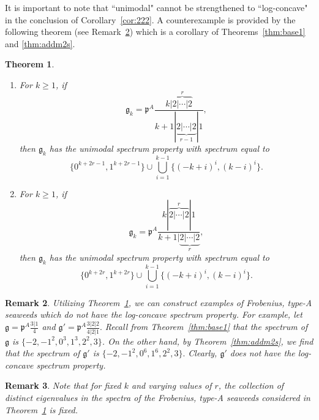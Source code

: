\documentclass[letterpaper,10pt]{article}
\newtheorem{theorem}{Theorem}
\newtheorem{remark}[theorem]{Remark}
\begin{document}
It is important to note that ``unimodal" cannot be strengthened to ``log-concave" in the conclusion of Corollary~\ref{cor:222}. A counterexample is provided by the following theorem (see Remark~\ref{rem:nlcc}) which is a corollary of Theorems~\ref{thm:base1} and \ref{thm:addm2s}.


\begin{theorem}\label{thm:base1ext}
\begin{enumerate}
    \item[\textup{(1)}] For $k\ge 1$, if $$\mathfrak{g}_k=\mathfrak{p}^A\frac{k|\overbrace{2|\cdots|2}^r}{k+1|\underbrace{2|\cdots|2}_{r-1}|1},$$ then $\mathfrak{g}_k$ has the unimodal spectrum property with spectrum equal to 
$$\{0^{k+2r-1},1^{k+2r-1}\}\cup\bigcup_{i=1}^{k-1}\{(-k+i)^i,(k-i)^i\}.$$
\item[\textup{(2)}] For $k\ge 1$, if $$\mathfrak{g}_k=\mathfrak{p}^A\frac{k|\overbrace{2|\cdots|2}^r|1}{k+1|\underbrace{2|\cdots|2}_{r}},$$ then $\mathfrak{g}_k$ has the unimodal spectrum property with spectrum equal to $$\{0^{k+2r},1^{k+2r}\}\cup\bigcup_{i=1}^{k-1}\{(-k+i)^i,(k-i)^i\}.$$
\end{enumerate}
\end{theorem}

\begin{remark}\label{rem:nlcc}
    Utilizing Theorem~\ref{thm:base1ext}, we can construct examples of Frobenius, type-A seaweeds which do not have the log-concave spectrum property. For example, let $\mathfrak{g}=\mathfrak{p}^A\frac{3|1}{4}$ and $\mathfrak{g}'=\mathfrak{p}^A\frac{3|2|2}{4|2|1}.$ Recall from Theorem~\ref{thm:base1} that the spectrum of $\mathfrak{g}$ is $\{-2,-1^2,0^3,1^3,2^2,3\}$. On the other hand, by Theorem~\ref{thm:addm2s}, we find that the spectrum of $\mathfrak{g}'$ is $\{-2,-1^2,0^6,1^6,2^2,3\}.$ Clearly, $\mathfrak{g}'$ does not have the log-concave spectrum property.
\end{remark}

\begin{remark}
Note that for fixed $k$ and varying values of $r$, the collection of distinct eigenvalues in the spectra of the Frobenius, type-A seaweeds considered in Theorem~\ref{thm:base1ext} is fixed.
\end{remark}
\end{document}
